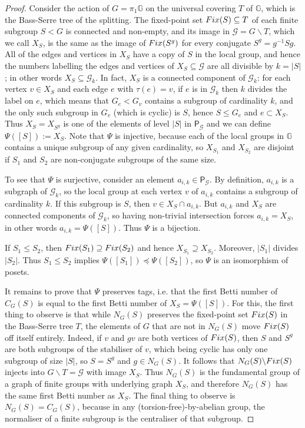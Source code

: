 \documentclass[10pt,a4paper]{amsart}
\def\GG{\mathbb{G}}
\def\mc{\mathcal}
\begin{document}
\begin{proof}
	Consider the action of $G=\pi_1\GG$ on
	the universal covering $T$ of $\GG$, which is the Bass-Serre tree of the splitting.
	The fixed-point set ${\rm{Fix}}(S)\subseteq T$ of each finite subgroup $S<G$
	is connected and non-empty, and its image in $\mc{G}=G\backslash T$, which we call  $X_S$, is the same as the image of
	${\rm{Fix}}(S^g)$ for every conjugate $S^g=g^{-1}Sg$. All of the edges and vertices in $X_S$
	have a copy of $S$ in the local group, and hence the numbers labelling the edges and vertices of $X_S\subseteq\mc{G}$
	are all divisible by $k=|S|$; in other words $X_S\subseteq\mc{G}_k$. In fact,
	$X_S$ is a connected component of $\mc{G}_k$: for each vertex $v\in X_S$ and each
	edge $e$ with $\tau(e)=v$, if $e$ is in $\mc{G}_k$ then $k$ divides
	the label on $e$, which means that  $G_e<G_v$ contains a subgroup of cardinality $k$, and the only such subgroup in  
	$G_v$ (which is cyclic) is $S$, hence $S \leq G_e$ and $e\subset X_S$.  Thus $X_S=X_{S^g}$  is one of the elements
	of level $|S|$ in  $\mathsf{P}_\mathcal{G}$ and we can define $\Psi([S]) := X_S$.
	Note that $\Psi$ is injective, because each of the local groups  in $\GG$ contains a unique subgroup
	of any given cardinality, so $X_{S_1}$ and $X_{S_2}$ are disjoint if $S_1$ and $S_2$ are non-conjugate subgroups
	of the same size.
	
	To see that $\Psi$ is surjective, consider an element $a_{i,k}\in \mathsf{P}_\mathcal{G}$. By definition,
	$a_{i,k}$ is a subgraph of $\mc{G}_k$, so the local group at each vertex $v$ of $a_{i,k}$ contains a subgroup of
	cardinality $k$. If this subgroup is $S$, then $v\in X_S \cap a_{i,k}$. 
	But $a_{i,k}$ and $X_S$ are connected components of $\mc{G}_k$, so having non-trivial intersection forces $a_{i,k}=X_S$,
	in other words $a_{i,k} = \Psi([S])$. Thus $\Psi$ is a bijection.
	
	If $S_1 \leq S_2$, then ${\rm{Fix}}(S_1)\supseteq {\rm{Fix}}(S_2)$ 
	and hence $X_{S_1}\supseteq X_{S_2}$.
	Moreover, $|S_1|$ divides $|S_2|$. 
	Thus $S_1 \leq S_2$ implies $\Psi([S_1]) \preceq \Psi([S_2])$,
	so $\Psi$ is an isomorphism of posets.
	
	It remains to prove that $\Psi$ preserves tags, i.e. that the first Betti number of $C_G(S)$ is equal to the
	first Betti number of $X_S = \Psi([S])$. For this, the first thing to observe is that 
	while $N_G(S)$ preserves the fixed-point set ${\rm{Fix}}(S)$ in the Bass-Serre tree $T$,
	the elements of $G$ that are not in $N_G(S)$ move ${\rm{Fix}}(S)$  off itself entirely. 
	Indeed,  if $v$ and $gv$ are both vertices of ${\rm{Fix}}(S)$, then $S$ and $S^g$ are both subgroups of the
	stabiliser of $v$, which being cyclic has only one subgroup of size $|S|$, so $S=S^g$ and $g\in N_G(S)$.
	It follows that $N_G(S)\backslash{\rm{Fix}}(S)$ injects into $G\backslash T = \mathcal{G}$ with image $X_S$.
	Thus $N_G(S)$ is the fundamental group of a graph of finite groups with underlying graph $X_S$,
	and therefore $N_G(S)$ has  the same first Betti number as $X_S$. 
	The final thing to observe is  $N_G(S) = C_G(S)$, because in any (torsion-free)-by-abelian group,
	the normaliser of a finite subgroup  is the centraliser of that subgroup. 
\end{proof}
\end{document}
